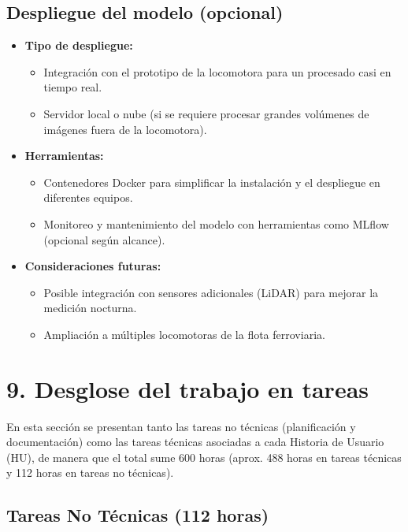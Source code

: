 \documentclass[
11pt, %
]{ProyectoVpC}
\begin{document}
\subsection{Despliegue del modelo (opcional)}
\begin{itemize}
  \item \textbf{Tipo de despliegue:} 
    \begin{itemize}
      \item Integración con el prototipo de la locomotora para un procesado casi en tiempo real.
      \item Servidor local o nube (si se requiere procesar grandes volúmenes de imágenes fuera de la locomotora).
    \end{itemize}
  \item \textbf{Herramientas:} 
    \begin{itemize}
      \item Contenedores Docker para simplificar la instalación y el despliegue en diferentes equipos.
      \item Monitoreo y mantenimiento del modelo con herramientas como MLflow (opcional según alcance).
    \end{itemize}
  \item \textbf{Consideraciones futuras:}
    \begin{itemize}
      \item Posible integración con sensores adicionales (LiDAR) para mejorar la medición nocturna.
      \item Ampliación a múltiples locomotoras de la flota ferroviaria.
    \end{itemize}
\end{itemize}

\section{9. Desglose del trabajo en tareas}
En esta sección se presentan tanto las tareas no técnicas (planificación y documentación) como las tareas técnicas asociadas a cada Historia de Usuario (HU), de manera que el total sume 600 horas (aprox. 488 horas en tareas técnicas y 112 horas en tareas no técnicas).

\subsection{Tareas No Técnicas (112 horas)}
\end{document}
